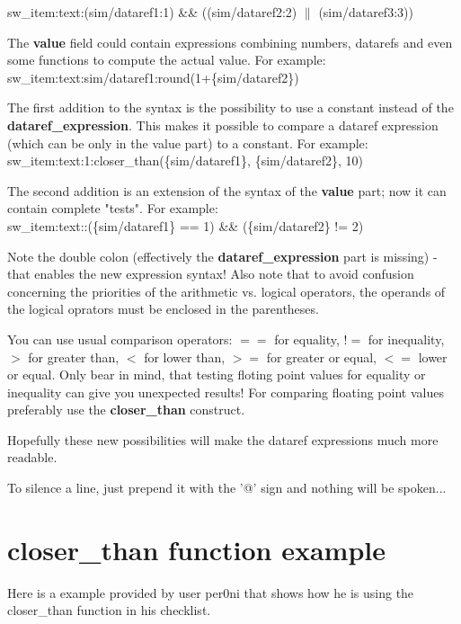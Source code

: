 \documentclass[11pt,parskip=half,a4paper]{scrartcl}
\begin{document}
sw\_item:text:(sim/dataref1:1) \&\& ((sim/dataref2:2) $\|$ (sim/dataref3:3)) \

The \textbf{value} field could contain expressions combining numbers, datarefs and even some functions to compute the actual value.
For example: \\

sw\_item:text:sim/dataref1:round(1+\{sim/dataref2\}) \

The first addition to the syntax is the possibility to use a constant instead of the \textbf{dataref\_expression}. This makes it possible to compare a dataref expression (which can be only in the value part) to a constant.
For example: \\

sw\_item:text:1:closer\_than(\{sim/dataref1\}, \{sim/dataref2\}, 10) \

The second addition is an extension of the syntax of the \textbf{value} part; now it can contain complete "tests".
For example: \\

sw\_item:text::(\{sim/dataref1\} == 1) \&\& (\{sim/dataref2\} != 2) \

Note the double colon (effectively the \textbf{dataref\_expression} part is missing) - that enables the new expression syntax!
Also note that to avoid confusion concerning the priorities of the arithmetic vs. logical operators, the operands of the logical oprators must be enclosed in the parentheses.

You can use usual comparison operators: $==$ for equality, $!=$ for inequality, $>$ for greater than, $<$ for lower than, $>=$ for greater or equal, $<=$ lower or equal. Only bear in mind, that testing floting point values for equality or inequality can give you unexpected results! For comparing floating point values preferably use the \textbf{closer\_than} construct.

Hopefully these  new possibilities will make the dataref expressions much more readable.

To silence a line, just prepend it with the '@' sign and nothing will be spoken... 

\newpage
\section{closer\_than function example}

Here is a example provided by user per0ni that shows how he is using the closer\_than function in his checklist.
\end{document}
